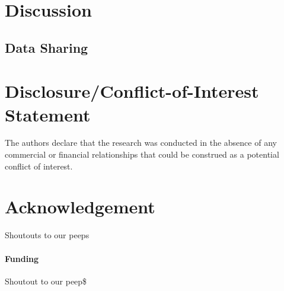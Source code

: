 \documentclass{frontiersSCNS} %
\begin{document}
\section{Discussion}

\subsection{Data Sharing}

\section*{Disclosure/Conflict-of-Interest Statement}
The authors declare that the research was conducted in the absence of any commercial or financial relationships that could be construed as a potential conflict of interest.

\section*{Acknowledgement}
Shoutouts to our peeps

\paragraph{Funding\textcolon} Shoutout to our peep\$
\end{document}
